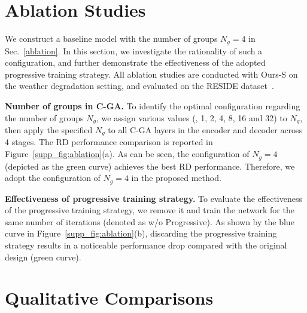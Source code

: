 \section{Ablation Studies}\label{supp_sec:ab}
We construct a baseline model with the number of groups $N_g=4$ in Sec.~\ref{ablation}. In this section, we investigate the rationality of such a configuration, and further demonstrate the effectiveness of the adopted progressive training strategy. All ablation studies are conducted with Ours-S on the weather degradation setting, and evaluated on the RESIDE dataset~\cite{reside}.


\noindent \textbf{Number of groups in C-GA.}   To identify the optimal configuration regarding the number of groups $N_g$, we assign various values (\ie, 1, 2, 4, 8, 16 and 32) to $N_g$, then apply the specified $N_g$ to all C-GA layers in the encoder and decoder across 4 stages. The RD performance comparison is reported in Figure~\ref{supp_fig:ablation}(a). As can be seen, the configuration of $N_g=4$ (depicted as the green curve) achieves the best RD performance. Therefore, we adopt the configuration of $N_g=4$ in the proposed method.
 
  \noindent  \textbf{Effectiveness of progressive training strategy. } 
 To evaluate the effectiveness of the progressive training strategy, we remove it and train the network for the same number of iterations (denoted as w/o Progressive). As shown by the blue curve in Figure~\ref{supp_fig:ablation}(b),  discarding the progressive training strategy results in a noticeable performance drop compared with the original design (green curve). 



\section{Qualitative Comparisons}\label{supp_sec:figs} 
